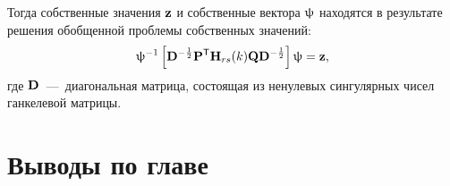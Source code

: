 Тогда собственные значения $ \mathbf{z} $ и собственные вектора $ \mathbf{\uppsi} $ находятся в результате решения обобщенной проблемы собственных значений:
\begin{equation}
	\mathbf{\uppsi} ^ {-1} \left[ \mathbf{D} ^ {-\frac{1}{2}} \mathbf{P} ^ \mathsf{T} \mathbf{H}_{rs}(k) \mathbf{Q} \mathbf{D} ^ {-\frac{1}{2}} \right] \uppsi = \mathbf{z},
\end{equation}
где $ \mathbf{D} $~---~диагональная матрица, состоящая из ненулевых сингулярных чисел ганкелевой матрицы.

\section{Выводы по главе \thechapter}